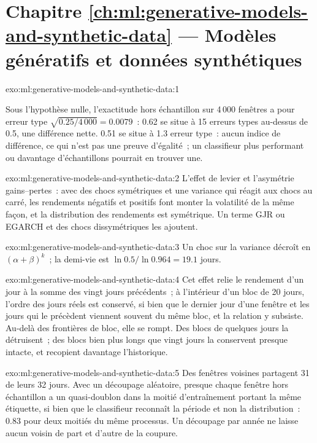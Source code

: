 \section*{Chapitre \ref{ch:ml:generative-models-and-synthetic-data} --- Modèles génératifs et données synthétiques}

\begin{solution}{exo:ml:generative-models-and-synthetic-data:1}
\begin{sloppypar}
Sous l'hypothèse nulle, l'exactitude hors échantillon sur 4\,000 fenêtres a pour erreur type $\sqrt{0.25/4\,000} = 0.0079$~: 0.62 se situe à 15
erreurs types au-dessus de 0.5, une différence nette. 0.51 se situe à 1.3 erreur type~: aucun indice de différence, ce qui n'est pas
une preuve d'égalité~; un classifieur plus performant ou davantage d'échantillons pourrait en trouver une.
\end{sloppypar}
\end{solution}

\begin{solution}{exo:ml:generative-models-and-synthetic-data:2}
L'effet de levier et l'asymétrie gains--pertes~: avec des chocs symétriques et une variance qui réagit aux chocs au carré, les rendements négatifs
et positifs font monter la volatilité de la même façon, et la distribution des rendements est symétrique. Un terme GJR ou EGARCH et des chocs dissymétriques
les ajoutent.
\end{solution}

\begin{solution}{exo:ml:generative-models-and-synthetic-data:3}
Un choc sur la variance décroît en $(\alpha + \beta)^k$~; la demi-vie est $\ln 0.5/\ln 0.964 = 19.1$ jours.
\end{solution}

\begin{solution}{exo:ml:generative-models-and-synthetic-data:4}
Cet effet relie le rendement d'un jour à la somme des vingt jours précédents~; à l'intérieur d'un bloc de 20 jours, l'ordre des jours réels est conservé,
si bien que le dernier jour d'une fenêtre et les jours qui le précèdent viennent souvent du même bloc, et la relation y subsiste. Au-delà des
frontières de bloc, elle se rompt. Des blocs de quelques jours la détruisent~; des blocs bien plus longs que vingt jours la conservent presque intacte, et
recopient davantage l'historique.
\end{solution}

\begin{solution}{exo:ml:generative-models-and-synthetic-data:5}
Des fenêtres voisines partagent 31 de leurs 32 jours. Avec un découpage aléatoire, presque chaque fenêtre hors échantillon a un quasi-doublon dans la
moitié d'entraînement portant la même étiquette, si bien que le classifieur reconnaît la période et non la distribution~: 0.83 pour deux moitiés du
même processus. Un découpage par année ne laisse aucun voisin de part et d'autre de la coupure.
\end{solution}

